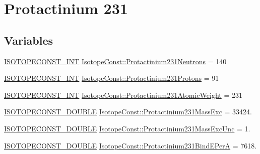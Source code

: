 \hypertarget{group___isotope_const-_protactinium-_pa231}{}\section{Protactinium 231}
\label{group___isotope_const-_protactinium-_pa231}
\subsection*{Variables}
\begin{DoxyCompactItemize}
\item 
\mbox{\hyperlink{group___isotope_const-_macros_ga5f18360b3e99483a35c32d789e62621c}{I\+S\+O\+T\+O\+P\+E\+C\+O\+N\+S\+T\+\_\+\+I\+NT}} \mbox{\hyperlink{group___isotope_const-_protactinium-_pa231_gaaad513bf528147f4447fd2fd3356a6b8}{Isotope\+Const\+::\+Protactinium231\+Neutrons}} = 140
\item 
\mbox{\hyperlink{group___isotope_const-_macros_ga5f18360b3e99483a35c32d789e62621c}{I\+S\+O\+T\+O\+P\+E\+C\+O\+N\+S\+T\+\_\+\+I\+NT}} \mbox{\hyperlink{group___isotope_const-_protactinium-_pa231_ga5b456aac7077c68a27a4b35870ded584}{Isotope\+Const\+::\+Protactinium231\+Protons}} = 91
\item 
\mbox{\hyperlink{group___isotope_const-_macros_ga5f18360b3e99483a35c32d789e62621c}{I\+S\+O\+T\+O\+P\+E\+C\+O\+N\+S\+T\+\_\+\+I\+NT}} \mbox{\hyperlink{group___isotope_const-_protactinium-_pa231_ga675992cb606d7077ce1b13d6327c0441}{Isotope\+Const\+::\+Protactinium231\+Atomic\+Weight}} = 231
\item 
\mbox{\hyperlink{group___isotope_const-_macros_ga8f45a7272ce02c0b4c65c44636ed719a}{I\+S\+O\+T\+O\+P\+E\+C\+O\+N\+S\+T\+\_\+\+D\+O\+U\+B\+LE}} \mbox{\hyperlink{group___isotope_const-_protactinium-_pa231_ga9cbb78d0da282cc01e2c5a9133d489d8}{Isotope\+Const\+::\+Protactinium231\+Mass\+Exc}} = 33424.
\item 
\mbox{\hyperlink{group___isotope_const-_macros_ga8f45a7272ce02c0b4c65c44636ed719a}{I\+S\+O\+T\+O\+P\+E\+C\+O\+N\+S\+T\+\_\+\+D\+O\+U\+B\+LE}} \mbox{\hyperlink{group___isotope_const-_protactinium-_pa231_ga5224a6b6a43b9b9b859d98d9aef4a3d3}{Isotope\+Const\+::\+Protactinium231\+Mass\+Exc\+Unc}} = 1.
\item 
\mbox{\hyperlink{group___isotope_const-_macros_ga8f45a7272ce02c0b4c65c44636ed719a}{I\+S\+O\+T\+O\+P\+E\+C\+O\+N\+S\+T\+\_\+\+D\+O\+U\+B\+LE}} \mbox{\hyperlink{group___isotope_const-_protactinium-_pa231_ga91f1e3e9a0e9bbe7c2d031316a0b9d8b}{Isotope\+Const\+::\+Protactinium231\+Bind\+E\+PerA}} = 7618.

\end{DoxyCompactItemize}
